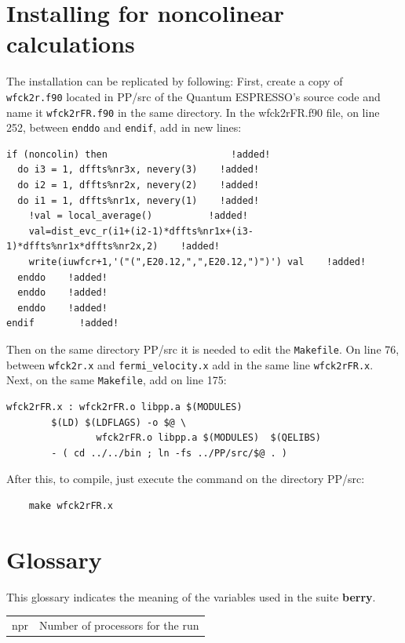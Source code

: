 \documentclass[a4paper,12pt]{report}
\begin{document}
\begin{appendices}

\chapter{Installing for noncolinear calculations}
\label{ch:noncolinear}
The installation can be replicated by following:
First, create a copy of \verb|wfck2r.f90| located in PP/src of the Quantum ESPRESSO's source code and name it \verb|wfck2rFR.f90| in the same directory.
In the wfck2rFR.f90 file, on line 252, between \verb|enddo| and \verb|endif|, add in new lines:
\begin{verbatim}
if (noncolin) then                      !added!
  do i3 = 1, dffts%nr3x, nevery(3)    !added!
  do i2 = 1, dffts%nr2x, nevery(2)    !added!
  do i1 = 1, dffts%nr1x, nevery(1)    !added!
    !val = local_average()          !added!
    val=dist_evc_r(i1+(i2-1)*dffts%nr1x+(i3-1)*dffts%nr1x*dffts%nr2x,2)    !added!
    write(iuwfcr+1,'("(",E20.12,",",E20.12,")")') val    !added!
  enddo    !added!
  enddo    !added!
  enddo    !added!
endif        !added!
\end{verbatim}


Then on the same directory PP/src it is needed to edit the \verb|Makefile|.
On line  76, between \verb|wfck2r.x| and \verb|fermi_velocity.x| add in the same line \verb|wfck2rFR.x|.
Next, on the same \verb|Makefile|, add on line 175:

\begin{verbatim}
wfck2rFR.x : wfck2rFR.o libpp.a $(MODULES)
        $(LD) $(LDFLAGS) -o $@ \
                wfck2rFR.o libpp.a $(MODULES)  $(QELIBS)
        - ( cd ../../bin ; ln -fs ../PP/src/$@ . )
\end{verbatim}

After this, to compile, just execute the command on the directory PP/src:

\begin{verbatim}
    make wfck2rFR.x
\end{verbatim}


\chapter{Glossary}

This glossary indicates the meaning of the variables used in the suite \textbf{berry}.
\vspace{0.5cm}

\begin{tabularx}{\textwidth}{Xl}
 npr            & Number of processors for the run \\


\end{tabularx}
\end{appendices}
\end{document}

